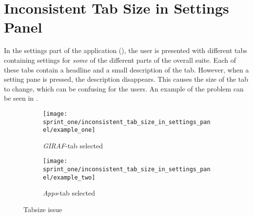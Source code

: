 
\section{Inconsistent Tab Size in Settings Panel}
\label{sec:inconsistent_tab_size_in_settings_panel}

In the settings part of the \launcher application (), the user is presented with different tabs containing settings for \emph{some} of the different parts of the overall \giraf suite. Each of these tabs contain a headline and a small description of the tab. However, when a setting pane is pressed, the description disappears. This causes the size of the tab to change, which can be confusing for the users. An example of the problem can be seen in .

\begin{figure}[!htbp]
    \centering

    \begin{subfigure}[t]{0.3\textwidth}
        \texttt{[image: sprint\_one/inconsistent\_tab\_size\_in\_settings\_panel/example\_one]}
        \caption{\emph{GIRAF}-tab selected}
        \label{fig:inconsistent_tab_size_in_settings_panel_example_one}
    \end{subfigure}
    \hspace{5em} 
    \begin{subfigure}[t]{0.3\textwidth}
        \texttt{[image: sprint\_one/inconsistent\_tab\_size\_in\_settings\_panel/example\_two]}
        \caption{\emph{Apps}-tab selected}
        \label{fig:inconsistent_tab_size_in_settings_panel_example_two}
    \end{subfigure}
    
    \caption{Tabsize issue}
    \label{fig:inconsistent_tab_size_in_settings_panel_example}
\end{figure}

